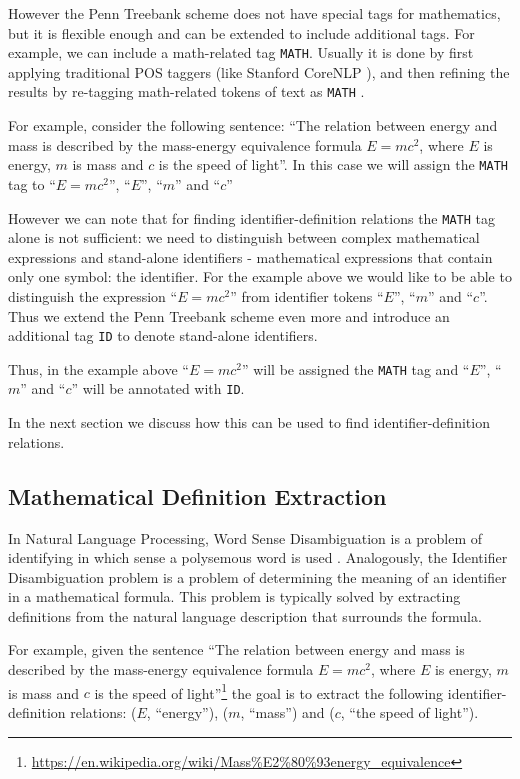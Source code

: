 However the Penn Treebank scheme does not have special tags for mathematics,
but it is flexible enough and can be extended to include additional tags.
For example, we can include a math-related tag \texttt{MATH}.
Usually it is done by first applying traditional POS taggers (like Stanford
CoreNLP \cite{manning2014stanford}), and then
refining the results by re-tagging math-related tokens of text as \texttt{MATH}
\cite{schoneberg2014pos}.


For example, consider the following sentence:
``The relation between energy and mass is
described by  the mass-energy equivalence formula $E = mc^2$,
where $E$ is energy, $m$ is mass and $c$ is the speed of light''.
In this case we will assign the \verb|MATH| tag to ``$E = mc^2$'', ``$E$'',
``$m$'' and ``$c$''

However we can note that for finding identifier-definition relations
the \texttt{MATH} tag alone is not sufficient: we need to distinguish
between complex mathematical expressions and stand-alone identifiers -
mathematical expressions that contain only one symbol: the identifier.
For the example above we would like to be able to distinguish the
expression ``$E = mc^2$'' from identifier tokens ``$E$'',
``$m$'' and ``$c$''. Thus we extend the Penn Treebank scheme even more
and introduce an additional tag \texttt{ID} to denote stand-alone identifiers.


Thus, in the example above ``$E = mc^2$'' will be assigned the \texttt{MATH} tag
and ``$E$'', ``$m$'' and ``$c$'' will be annotated with \texttt{ID}.

In the next section we discuss how this can be used to find identifier-definition
relations.


\subsection{Mathematical Definition Extraction} \label{sec:definition-extraction-methods}

In Natural Language Processing, Word Sense Disambiguation is a problem of
identifying in which sense a polysemous word is used \cite{jurafsky2000speech}.
Analogously, the Identifier Disambiguation problem is a problem of
determining the meaning of an identifier in a mathematical formula. This
problem is typically solved by extracting definitions from the natural
language description that surrounds the formula.

For example, given the sentence ``The relation between energy and mass is
described by  the mass-energy equivalence formula $E = mc^2$,
where $E$ is energy, $m$ is mass and $c$ is the speed of
light''\footnote{\url{https://en.wikipedia.org/wiki/Mass\%E2\%80\%93energy\_equivalence}}
the goal is to extract the following identifier-definition relations:
($E$, ``energy''), ($m$, ``mass'') and ($c$, ``the speed of light'').

